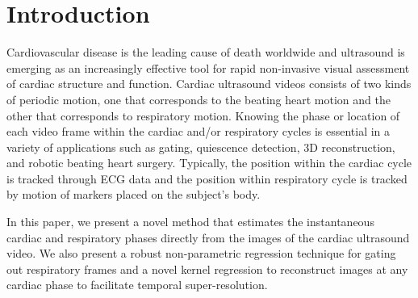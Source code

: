 \documentclass[runningheads,a4paper]{llncs}
\begin{document}
\section{Introduction}
\label{sec:intro}
%
Cardiovascular disease is the leading cause of death worldwide and ultrasound is emerging as an increasingly effective tool for rapid non-invasive visual assessment of cardiac structure and function. Cardiac ultrasound videos consists of two kinds of periodic motion, one that corresponds to the beating heart motion and the other that corresponds to respiratory motion. Knowing the phase or location of each video frame within the cardiac and/or respiratory cycles is essential in a variety of applications such as gating, quiescence detection, 3D reconstruction, and robotic beating heart surgery\cite{VonBirgelen1997,Wick2013,Wachinger2012,Kurz2015}. Typically, the position within the cardiac cycle is tracked through ECG data and the position within respiratory cycle is tracked by motion of markers placed on the subject's body\cite{Khamene2004}. 

	In this paper, we present a novel method that estimates the instantaneous cardiac and respiratory phases directly from the images of the cardiac ultrasound video. We also present a robust non-parametric regression technique for gating out respiratory frames and a novel kernel regression to reconstruct images at any cardiac phase to facilitate temporal super-resolution.	
%
\vspace{-0.3cm}
\end{document}
